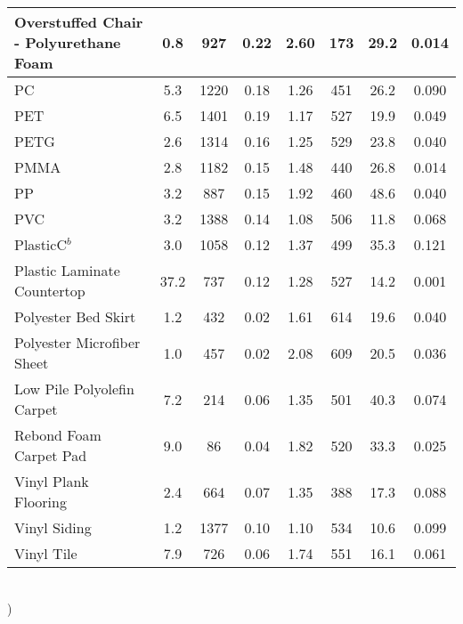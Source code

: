 \begin{table}[!h]
\begin{tabular}{|p{6.5cm}|c|c|c|c|c|c|c|}
Overstuffed Chair - Polyurethane Foam             & 0.8  & 927  & 0.22 & 2.60 & 173 & 29.2 & 0.014 \\\hline
PC                                                & 5.3  & 1220 & 0.18 & 1.26 & 451 & 26.2 & 0.090 \\\hline
PET                                               & 6.5  & 1401 & 0.19 & 1.17 & 527 & 19.9 & 0.049 \\\hline
PETG                                              & 2.6  & 1314 & 0.16 & 1.25 & 529 & 23.8 & 0.040 \\\hline
PMMA                                              & 2.8  & 1182 & 0.15 & 1.48 & 440 & 26.8 & 0.014 \\\hline
PP                                                & 3.2  & 887  & 0.15 & 1.92 & 460 & 48.6 & 0.040 \\\hline
PVC                                               & 3.2  & 1388 & 0.14 & 1.08 & 506 & 11.8 & 0.068 \\\hline
PlasticC$^{b}$                                    & 3.0  & 1058 & 0.12 & 1.37 & 499 & 35.3 & 0.121 \\\hline
Plastic Laminate Countertop                       & 37.2 & 737  & 0.12 & 1.28 & 527 & 14.2 & 0.001 \\\hline
Polyester Bed Skirt                               & 1.2  & 432  & 0.02 & 1.61 & 614 & 19.6 & 0.040 \\\hline
Polyester Microfiber Sheet                        & 1.0  & 457  & 0.02 & 2.08 & 609 & 20.5 & 0.036 \\\hline
Low Pile Polyolefin Carpet                        & 7.2  & 214  & 0.06 & 1.35 & 501 & 40.3 & 0.074 \\\hline
Rebond Foam Carpet Pad                            & 9.0  & 86   & 0.04 & 1.82 & 520 & 33.3 & 0.025 \\\hline
Vinyl Plank Flooring                              & 2.4  & 664  & 0.07 & 1.35 & 388 & 17.3 & 0.088 \\\hline
Vinyl Siding                                      & 1.2  & 1377 & 0.10 & 1.10 & 534 & 10.6 & 0.099 \\\hline
Vinyl Tile                                        & 7.9  & 726  & 0.06 & 1.74 & 551 & 16.1 & 0.061 \\\hline
\end{tabular}
\label{Properties_FSRI_Materials_Polymers}
\end{table}
\vspace{-0.4cm}
\\
)\\

